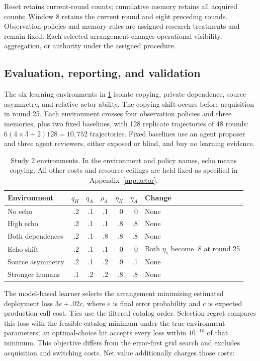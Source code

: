 Reset retains current-round counts; cumulative memory retains all acquired counts; Window 8 retains the current round and eight preceding rounds. Observation policies and memory rules are assigned research treatments and remain fixed. Each selected arrangement changes operational visibility, aggregation, or authority under the assigned procedure.

\subsection{Evaluation, reporting, and validation}
The six learning environments in \cref{tab:actor-worlds} isolate copying, private dependence, source asymmetry, and relative actor ability. The copying shift occurs before acquisition in round 25. Each environment crosses four observation policies and three memories, plus two fixed baselines, with 128 replicate trajectories of 48 rounds: $6(4\times3+2)128=10{,}752$ trajectories. Fixed baselines use an agent proposer and three agent reviewers, either exposed or blind, and buy no learning evidence.
\begin{table}[!htbp]
\caption{Study 2 environments. In the environment and policy names, echo means copying. All other costs and resource ceilings are held fixed as specified in Appendix~\ref{app:actor}. }
\label{tab:actor-worlds}\centering\small
\begin{tabular}{@{}lrrrrrl@{}}\toprule
Environment & $q_H$ & $q_A$ & $\rho_A$ & $\eta_H$ & $\eta_A$ & Change \\\midrule
No echo & .2 & .1 & .1 & 0 & 0 & None \\
High echo & .2 & .1 & .1 & .8 & .8 & None \\
Both dependences & .2 & .1 & .8 & .8 & .8 & None \\
Echo shift & .2 & .1 & .1 & 0 & 0 & Both $\eta_s$ become .8 at round 25 \\
Source asymmetry & .2 & .1 & .2 & .9 & .1 & None \\
Stronger humans & .1 & .2 & .2 & .8 & .8 & None \\\bottomrule
\end{tabular}
\end{table}
The model-based learner selects the arrangement minimizing estimated deployment loss $3e+.02c$, where $e$ is final error probability and $c$ is expected production call cost. Ties use the filtered catalog order. Selection regret compares this loss with the feasible catalog minimum under the true environment parameters; an optimal-choice hit accepts every loss within $10^{-10}$ of that minimum. This objective differs from the error-first grid search and excludes acquisition and switching costs. Net value additionally charges those costs:
